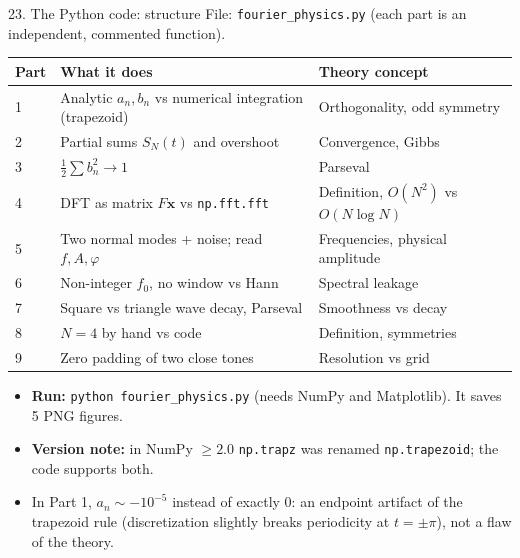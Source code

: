 \documentclass[aspectratio=169,10pt]{beamer}
\begin{document}
\begin{frame}{23. The Python code: structure}
  \small
  File: \texttt{fourier\_physics.py} (each part is an independent, commented function).
  \begin{center}
  \footnotesize
  \begin{tabular}{@{}p{}p{}p{}@{}}
    \toprule
    \textbf{Part} & \textbf{What it does} & \textbf{Theory concept}\\
    \midrule
    1 & Analytic $a_n,b_n$ vs numerical integration (trapezoid) & Orthogonality, odd symmetry\\
    2 & Partial sums $S_N(t)$ and overshoot & Convergence, Gibbs\\
    3 & $\frac12\sum b_n^2\to1$ & Parseval\\
    4 & DFT as matrix $F\mathbf x$ vs \texttt{np.fft.fft} & Definition, $O(N^2)$ vs $O(N\log N)$\\
    5 & Two normal modes + noise; read $f,A,\varphi$ & Frequencies, physical amplitude\\
    6 & Non-integer $f_0$, no window vs Hann & Spectral leakage\\
    7 & Square vs triangle wave decay, Parseval & Smoothness vs decay\\
    8 & $N=4$ by hand vs code & Definition, symmetries\\
    9 & Zero padding of two close tones & Resolution vs grid\\
    \bottomrule
  \end{tabular}
  \end{center}
  \begin{itemize}\footnotesize
    \item \textbf{Run:} \texttt{python fourier\_physics.py} (needs NumPy and Matplotlib). It saves 5 PNG figures.
    \item \textbf{Version note:} in NumPy $\ge2.0$ \texttt{np.trapz} was renamed \texttt{np.trapezoid}; the code supports both.
    \item In Part 1, $a_n\sim-10^{-5}$ instead of exactly $0$: an endpoint artifact of the trapezoid rule (discretization slightly breaks periodicity at $t=\pm\pi$), not a flaw of the theory.
  \end{itemize}
\end{frame}
\end{document}
